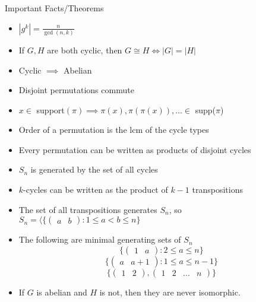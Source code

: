 \documentclass{article}
\begin{document}
\begin{multicols*}{3}
\begin{blackbox}{Important Facts/Theorems}
\begin{itemize}
        \item $|g^k| = \frac{n}{\gcd(n,k)}$
        \item If $G,H$ are both cyclic, then $G \cong H \iff |G| = |H|$
        \item Cyclic $\implies$ Abelian
        \item Disjoint permutations commute
        \item $x \in $ support$(\pi) \implies \pi(x), \pi(\pi(x)), \ldots \in$ supp($\pi$)
        \item Order of a permutation is the lcm of the cycle types
        \item Every permutation can be written as products of disjoint cycles
        \item $S_n$ is generated by the set of all cycles
        \item $k$-cycles can be written as the product of $k - 1$ transpositions
        \item The set of all transpositions generates $S_n$, so $S_n = \langle \{\begin{pmatrix}
            a & b
        \end{pmatrix}: 1 \leq a < b \leq n\}$
        \item The following are minimal generating sets of $S_n$
        \[\{\begin{pmatrix}
            1 & a
        \end{pmatrix}: 2 \leq a \leq n\}\]
        \[\{\begin{pmatrix}
            a & a+1
        \end{pmatrix}: 1 \leq a \leq n-1\}\]
        \[\{\begin{pmatrix}
            1 & 2
        \end{pmatrix}, \begin{pmatrix}
            1 & 2 & \ldots & n
        \end{pmatrix}\}\]
        \item If $G$ is abelian and $H$ is not, then they are never isomorphic.
    \end{itemize}
\end{blackbox}
\end{multicols*}
\end{document}
